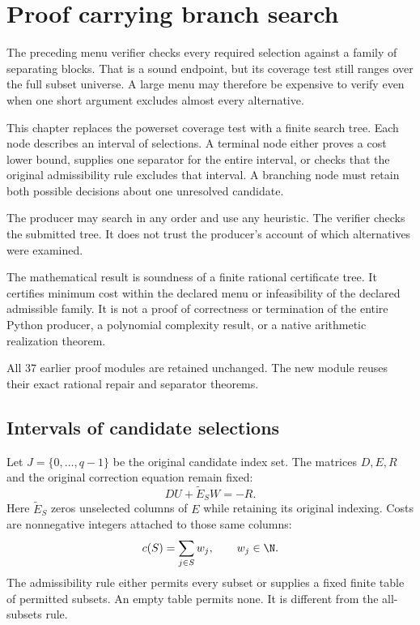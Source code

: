 \chapter{Proof carrying branch search}
\label{ch:branch-search}

The preceding menu verifier checks every required selection against a family of separating blocks. That is a sound endpoint, but its coverage test still ranges over the full subset universe. A large menu may therefore be expensive to verify even when one short argument excludes almost every alternative.

This chapter replaces the powerset coverage test with a finite search tree. Each node describes an interval of selections. A terminal node either proves a cost lower bound, supplies one separator for the entire interval, or checks that the original admissibility rule excludes that interval. A branching node must retain both possible decisions about one unresolved candidate.

The producer may search in any order and use any heuristic. The verifier checks the submitted tree. It does not trust the producer's account of which alternatives were examined.

\begin{scopebox}[title=The new verified boundary]
The mathematical result is soundness of a finite rational certificate tree. It certifies minimum cost within the declared menu or infeasibility of the declared admissible family. It is not a proof of correctness or termination of the entire Python producer, a polynomial complexity result, or a native arithmetic realization theorem.

All 37 earlier proof modules are retained unchanged. The new module reuses their exact rational repair and separator theorems.
\end{scopebox}

\section{Intervals of candidate selections}

Let $J=\{0,\ldots,q-1\}$ be the original candidate index set. The matrices $D,E,R$ and the original correction equation remain fixed:
\[
 DU+\widetilde E_S W=-R.
\]
Here $\widetilde E_S$ zeros unselected columns of $E$ while retaining its original indexing. Costs are nonnegative integers attached to those same columns:
\[
 c(S)=\sum_{j\in S}w_j,\qquad w_j\in\N.
\]
The admissibility rule either permits every subset or supplies a fixed finite table of permitted subsets. An empty table permits none. It is different from the all-subsets rule.

